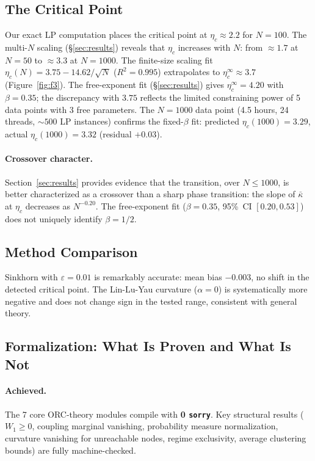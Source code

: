 \documentclass[12pt]{article}
\newcommand{\kbar}{\bar{\kappa}}
\newcommand{\etac}{\eta_c}
\newcommand{\Wone}{W_1}
\newcommand{\sorry}{\texttt{sorry}}
\begin{document}
\subsection{The Critical Point}

Our exact LP computation places the critical point at $\etac \approx 2.2$ for $N = 100$.
The multi-$N$ scaling (\S\ref{sec:results}) reveals that $\etac$ increases with $N$: from
$\approx 1.7$ at $N = 50$ to $\approx 3.3$ at $N = 1000$. The finite-size scaling fit
$\etac(N) = 3.75 - 14.62/\sqrt{N}$ ($R^2 = 0.995$) extrapolates to $\etac^\infty \approx 3.7$
(Figure~\ref{fig:f3}). The free-exponent fit (\S\ref{sec:results}) gives
$\etac^\infty = 4.20$ with $\beta = 0.35$; the discrepancy with $3.75$ reflects the limited
constraining power of 5 data points with 3 free parameters. The $N = 1000$ data point
(4.5 hours, 24 threads, $\sim\!500$ LP instances) confirms the fixed-$\beta$ fit:
predicted $\etac(1000) = 3.29$, actual $\etac(1000) = 3.32$ (residual $+0.03$).

\paragraph{Crossover character.} Section~\ref{sec:results} provides evidence that the
transition, over $N \leq 1000$, is better characterized as a crossover than a sharp phase
transition: the slope of $\kbar$ at $\etac$ decreases as $N^{-0.20}$. The free-exponent
fit ($\beta = 0.35$, 95\%~CI $[0.20, 0.53]$) does not uniquely identify $\beta = 1/2$.

\subsection{Method Comparison}

Sinkhorn with $\varepsilon = 0.01$ is remarkably accurate: mean bias $-0.003$, no shift
in the detected critical point. The Lin-Lu-Yau curvature ($\alpha = 0$) is systematically
more negative and does not change sign in the tested range, consistent with general theory.

\subsection{Formalization: What Is Proven and What Is Not}

\paragraph{Achieved.} The 7 core ORC-theory modules compile with \textbf{0 \sorry{}}. Key
structural results ($\Wone \geq 0$, coupling marginal vanishing, probability measure
normalization, curvature vanishing for unreachable nodes, regime exclusivity, average
clustering bounds) are fully machine-checked.
\end{document}
